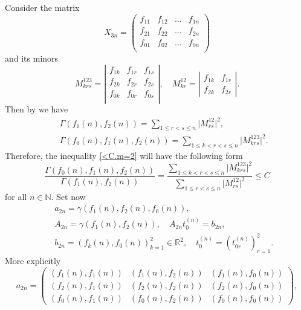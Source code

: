 \documentclass[preprint,12pt]{elsarticle}
\numberwithin{equation}{section}
\begin{document}
Consider the matrix
\begin{equation}
\label{X(mn).3}
X_{3n}=
\left(\begin{array}{cccc}
f_{11}&f_{12}&\dots&f_{1n}\\
f_{21}&f_{22}&\dots&f_{2n}\\
f_{01}&f_{02}&\dots&f_{0n}\\
\end{array}\right)
\end{equation}
and its minors
$$
M_{krs}^{123}=\left|\begin{array}{ccc}
f_{1k}&f_{1r}&f_{1s}\\
f_{2k}&f_{2r}&f_{2s}\\
f_{0k}&f_{0r}&f_{0s}\\
\end{array}\right|,\quad 
M_{kr}^{12}=
\left|\begin{array}{cc}
f_{1k}&f_{1r}\\
f_{2k}&f_{2r}
\end{array}\right|.
$$
Then by 
\cite{Gan58}
we have
\begin{eqnarray*}
&&\Gamma(f_1(n),f_2(n))=\sum_{1\leq r<s\leq n}\vert M_{rs}^{12}\vert^2,\\
 &&\Gamma(f_0(n),f_1(n),f_2(n))=\sum_{1\leq k<r<s\leq n}\vert M_{krs}^{123}\vert^2.
\end{eqnarray*}
%
Therefore, the inequality %
\eqref{<C.m=2}
will have the following form
\begin{equation}
\label{G(02):G(12)<C.2}
\frac{\Gamma(f_0(n),f_1(n),f_2(n))}{\Gamma(f_1(n),f_2(n))}
=\frac{\sum_{1\leq k<r<s\leq n}\vert M_{krs}^{123}\vert^2}
{\sum_{1\leq r<s\leq n}\vert M_{rs}^{12}\vert^2}\leq C
\end{equation}
for all $n\in \mathbb N$. Set now
\begin{eqnarray}
\nonumber
&&a_{2n}=\gamma(f_1(n),f_2(n),f_0(n)),\\
\label{A_3n.3}
&&A_{2n}=\gamma(f_1(n),f_2(n)),\quad A_{2n}t_0^{(n)}=b_{2n},\\
\label{b(n),t_0(n).3}
&&b_{2n}=(f_k(n),f_0(n))_{k=1}^2\in \mathbb R^2,\quad
t_0^{(n)}=(t_{0r}^{(n)})_{r=1}^2.
\end{eqnarray}
More explicitly
\begin{equation}
\label{a(mn).3}
a_{2n}\!=\!
\left(\!\!\begin{array}{ccc}
(f_1(n),f_1(n))&(f_1(n),f_2(n))&(f_1(n),f_0(n))\\
(f_2(n),f_1(n))&(f_2(n),f_2(n))&(f_2(n),f_0(n))\\
(f_0(n),f_1(n))&(f_0(n),f_2(n))&(f_0(n),f_0(n))
\end{array}\!\!\right),
\end{equation}
\end{document}
